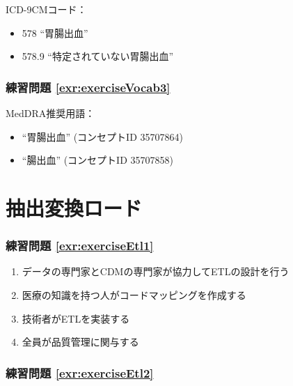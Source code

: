 \documentclass[
  11pt]{book}
\providecommand{\tightlist}{%
  \setlength{\itemsep}{0pt}\setlength{\parskip}{0pt}}
\theoremstyle{definition}
\theoremstyle{definition}
\theoremstyle{definition}
\theoremstyle{definition}
\theoremstyle{remark}
\begin{document}
ICD-9CMコード：

\begin{itemize}
\tightlist
\item
  578 ``胃腸出血''
\item
  578.9 ``特定されていない胃腸出血''
\end{itemize}

\subsubsection*{練習問題 \ref{exr:exerciseVocab3}}\label{ux7df4ux7fd2ux554fux984c-refexrexercisevocab3}

MedDRA推奨用語：

\begin{itemize}
\tightlist
\item
  ``胃腸出血'' (コンセプトID 35707864)
\item
  ``腸出血'' (コンセプトID 35707858)
\end{itemize}

\section{抽出変換ロード}\label{Etlanswers}

\subsubsection*{練習問題 \ref{exr:exerciseEtl1}}\label{ux7df4ux7fd2ux554fux984c-refexrexerciseetl1}

\begin{enumerate}
\def\labelenumi{\Alph{enumi})}
\tightlist
\item
  データの専門家とCDMの専門家が協力してETLの設計を行う
\item
  医療の知識を持つ人がコードマッピングを作成する
\item
  技術者がETLを実装する
\item
  全員が品質管理に関与する
\end{enumerate}

\subsubsection*{練習問題 \ref{exr:exerciseEtl2}}\label{ux7df4ux7fd2ux554fux984c-refexrexerciseetl2}
\end{document}
